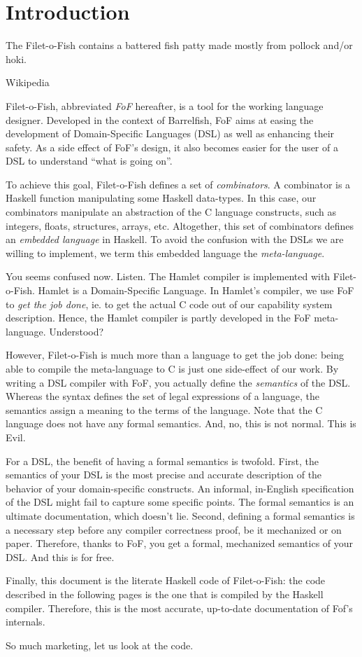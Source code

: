 \chapter*{Introduction}
\epigraph{The Filet-o-Fish contains a battered fish patty made mostly
          from pollock and/or hoki.}{Wikipedia}


Filet-o-Fish, abbreviated \emph{FoF} hereafter, is a tool for the
working language designer. Developed in the context of
Barrelfish\cite{mmcs-barrelfish}, FoF aims at easing the development
of Domain-Specific Languages (DSL) as well as enhancing their
safety. As a side effect of FoF's design, it also becomes easier for
the user of a DSL to understand ``what is going on''.

To achieve this goal, Filet-o-Fish defines a set of
\emph{combinators}. A combinator is a Haskell function manipulating
some Haskell data-types. In this case, our combinators manipulate an
abstraction of the C language constructs, such as integers, floats,
structures, arrays, etc. Altogether, this set of combinators defines
an \emph{embedded language} in Haskell. To avoid the confusion with
the DSLs we are willing to implement, we term this embedded language
the \emph{meta-language}. 

You seems confused now. Listen. The Hamlet compiler is implemented
with Filet-o-Fish. Hamlet is a Domain-Specific Language. In Hamlet's
compiler, we use FoF to \emph{get the job done}, ie. to get the actual
C code out of our capability system description. Hence, the Hamlet
compiler is partly developed in the FoF meta-language. Understood?

However, Filet-o-Fish is much more than a language to get the job
done: being able to compile the meta-language to C is just one
side-effect of our work. By writing a DSL compiler with FoF, you
actually define the \emph{semantics} of the DSL. Whereas the syntax
defines the set of legal expressions of a language, the semantics
assign a meaning to the terms of the language. Note that the C
language does not have any formal semantics. And, no, this is not
normal. This is Evil.

For a DSL, the benefit of having a formal semantics is twofold. First,
the semantics of your DSL is the most precise and accurate description
of the behavior of your domain-specific constructs. An informal,
in-English specification of the DSL might fail to capture some
specific points. The formal semantics is an ultimate documentation,
which doesn't lie. Second, defining a formal semantics is a necessary
step before any compiler correctness proof, be it mechanized or on
paper. Therefore, thanks to FoF, you get a formal, mechanized
semantics of your DSL. And this is for free.

Finally, this document is the literate Haskell code of Filet-o-Fish:
the code described in the following pages is the one that is compiled
by the Haskell compiler. Therefore, this is the most accurate,
up-to-date documentation of Fof's internals.

So much marketing, let us look at the code.

